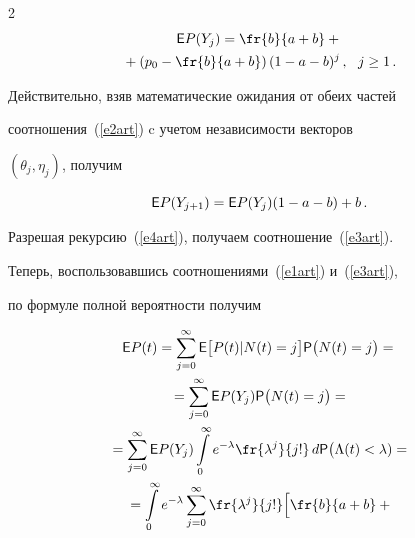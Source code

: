 \begin{multicols}{2}
\begin{multline}


{\sf E}P(Y_j)=\fr{b}{a+b}+{}\\


{}+\left (p_0-\fr{b}{a+b}\right )


(1-a-b)^j\,,\ \ j\ge1\,.


\label{e3art}


\end{multline}


Действительно, взяв математические ожидания от обеих частей


соотношения~(\ref{e2art}) c учетом независимости векторов


$(\theta_j,\eta_j)$, получим


\begin{equation}


{\sf E}P(Y_{j+1})={\sf E}P(Y_j)(1-a-b)+b\,.


\label{e4art}


\end{equation}


Разрешая рекурсию~(\ref{e4art}), получаем соотношение~(\ref{e3art}).





Теперь, воспользовавшись соотношениями~(\ref{e1art}) и~(\ref{e3art}),


по формуле полной вероятности получим


\begin{multline*}


{\sf E}P(t)=\sum_{j=0}^{\infty}{\sf E}\big[P(t)|N(t)=j\big]{\sf


P}\big(N(t)=j\big)={}\\


{}=\sum_{j=0}^{\infty}{\sf E}P(Y_j){\sf


P}\big(N(t)=j\big)={}\\


{}=\sum_{j=0}^{\infty}{\sf


E}P(Y_j)\int\limits_{0}^{\infty}e^{-\lambda}\fr{\lambda^j}{j!}\,d{\sf


P}\big(\Lambda(t)<\lambda)=


{}\\


{}=


\int\limits_{0}^{\infty}e^{-\lambda}\sum_{j=0}^{\infty}\fr{\lambda^j}{j!}\Big[


\fr{b}{a+b}+{}\\



\end{multline*}
\end{multicols}
